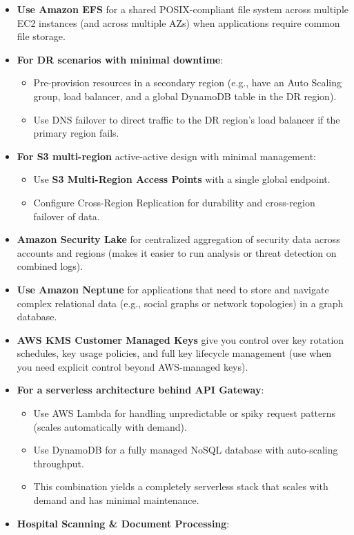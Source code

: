 \documentclass[11pt,a4paper]{report}
\begin{document}
\begin{itemize}
  \item \textbf{Use Amazon EFS} for a shared POSIX-compliant file system across multiple EC2 instances (and across multiple AZs) when applications require common file storage.
  \item \textbf{For DR scenarios with minimal downtime}:
\begin{itemize}
  \item Pre-provision resources in a secondary region (e.g., have an Auto Scaling group, load balancer, and a global DynamoDB table in the DR region).
  \item Use DNS failover to direct traffic to the DR region's load balancer if the primary region fails.
\end{itemize}
  \item \textbf{For S3 multi-region} active-active design with minimal management:
\begin{itemize}
  \item Use \textbf{S3 Multi-Region Access Points} with a single global endpoint.
  \item Configure Cross-Region Replication for durability and cross-region failover of data.
\end{itemize}
  \item \textbf{Amazon Security Lake} for centralized aggregation of security data across accounts and regions (makes it easier to run analysis or threat detection on combined logs).
  \item \textbf{Use Amazon Neptune} for applications that need to store and navigate complex relational data (e.g., social graphs or network topologies) in a graph database.
  \item \textbf{AWS KMS Customer Managed Keys} give you control over key rotation schedules, key usage policies, and full key lifecycle management (use when you need explicit control beyond AWS-managed keys).
  \item \textbf{For a serverless architecture behind API Gateway}:
\begin{itemize}
  \item Use AWS Lambda for handling unpredictable or spiky request patterns (scales automatically with demand).
  \item Use DynamoDB for a fully managed NoSQL database with auto-scaling throughput.
  \item This combination yields a completely serverless stack that scales with demand and has minimal maintenance.
\end{itemize}
  \item \textbf{Hospital Scanning \& Document Processing}:

\end{itemize}
\end{document}

